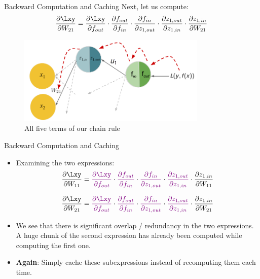 \begin{frame} {Backward Computation and Caching}
Next, let us compute:
      $$\frac{\partial \Lxy}{\partial W_{21}} = 
\frac{\partial \Lxy}{\partial f_{out}} \cdot  \textcolor{black}{\frac{\partial f_{out}}{\partial f_{in}}} \cdot  \textcolor{black}{\frac{\partial f_{in}}{\partial z_{1,out}}} \cdot  \textcolor{black}{\frac{\partial z_{1,out}}{\partial z_{1,in}}} \cdot  \textcolor{black}{\frac{\partial z_{1,in}}{\partial W_{21}}}$$
        \begin{figure}
    \centering
      \includegraphics[width=9cm]{figure/backprop_gg_new.png}
      \caption{All five terms of our chain rule}
  \end{figure}
\end{frame}

\begin{frame} {Backward Computation and Caching}
\begin{itemize}
\item Examining the two expressions:
$$\frac{\partial \Lxy}{\partial W_{11}} = 
\textcolor{violet}{\frac{\partial \Lxy}{\partial f_{out}}} \cdot  \textcolor{violet}{\frac{\partial f_{out}}{\partial f_{in}}} \cdot  \textcolor{violet}{\frac{\partial f_{in}}{\partial z_{1,out}}} \cdot  \textcolor{violet}{\frac{\partial z_{1,out}}{\partial z_{1,in}}} \cdot  \textcolor{black}{\frac{\partial z_{1,in}}{\partial W_{11}}}$$

$$\frac{\partial \Lxy}{\partial W_{21}} =     
\textcolor{violet}{\frac{\partial \Lxy}{\partial f_{out}}} \cdot  \textcolor{violet}{\frac{\partial f_{out}}{\partial f_{in}}} \cdot  \textcolor{violet}{\frac{\partial f_{in}}{\partial z_{1,out}}} \cdot  \textcolor{violet}{\frac{\partial z_{1,out}}{\partial z_{1,in}}} \cdot  \textcolor{black}{\frac{\partial z_{1,in}}{\partial W_{21}}}$$

\item We see that there is significant overlap / redundancy in the two expressions. A huge chunk of the second expression has already been computed while computing the first one.
\item \textbf{Again}: Simply cache these subexpressions instead of recomputing them each time.
\end{itemize}
\end{frame}

